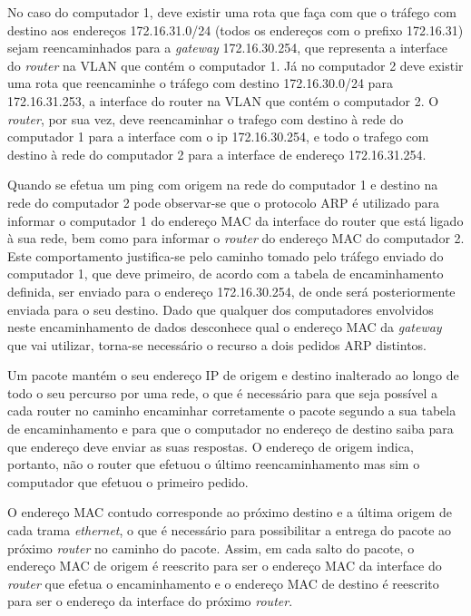 \documentclass{article}
\begin{document}
No caso do computador 1, deve existir uma rota que faça com que o tráfego com destino aos endereços 172.16.31.0/24 (todos os endereços com o prefixo 172.16.31) sejam reencaminhados para a \textit{gateway} 172.16.30.254, que representa a interface do \textit{router} na VLAN que contém o computador 1. Já no computador 2 deve existir uma rota que reencaminhe o tráfego com destino 172.16.30.0/24 para 172.16.31.253, a interface do router na VLAN que contém o computador 2. O \textit{router}, por sua vez, deve reencaminhar o trafego com destino à rede do computador 1 para a interface com o ip 172.16.30.254, e todo o trafego com destino à rede do computador 2 para a interface de endereço 172.16.31.254.

Quando se efetua um ping com origem na rede do computador 1 e destino na rede do computador 2 pode observar-se que o protocolo ARP é utilizado para informar o computador 1 do endereço MAC da interface do router que está ligado à sua rede, bem como para informar o \textit{router} do endereço MAC do computador 2. Este comportamento justifica-se pelo caminho tomado pelo tráfego enviado do computador 1, que deve primeiro, de acordo com a tabela de encaminhamento definida, ser enviado para o endereço 172.16.30.254, de onde será posteriormente enviada para o seu destino. Dado que qualquer dos computadores envolvidos neste encaminhamento de dados desconhece qual o endereço MAC da \textit{gateway} que vai utilizar, torna-se necessário o recurso a dois pedidos ARP distintos.

Um pacote  mantém o seu endereço IP de origem e destino inalterado ao longo de todo o seu percurso por uma rede, o que é necessário para que seja possível a cada router no caminho encaminhar corretamente o pacote segundo a sua tabela de encaminhamento e para que o computador no endereço de destino saiba para que endereço deve enviar as suas respostas. O endereço de origem indica, portanto, não o router que efetuou o último reencaminhamento mas sim o computador que efetuou o primeiro pedido.

O endereço MAC contudo corresponde ao próximo destino e a última origem de cada trama \textit{ethernet}, o que é necessário para possibilitar a entrega do pacote ao próximo \textit{router} no caminho do pacote. Assim, em cada salto do pacote, o endereço MAC de origem é reescrito para ser o endereço MAC da interface do  \textit{router} que efetua o encaminhamento e o endereço MAC de destino é reescrito para ser o endereço da interface do próximo \textit{router}.
\end{document}
